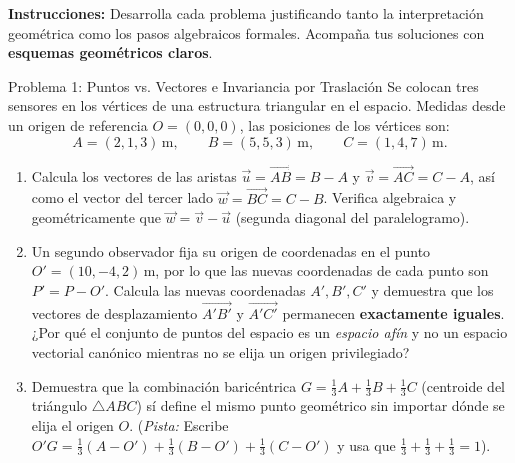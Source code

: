 \documentclass[11pt,letterpaper]{article}
\begin{document}
\setlength{\abovedisplayskip}{6pt}
\setlength{\belowdisplayskip}{6pt}
\setlength{\textfloatsep}{10pt}
\setlength{\intextsep}{8pt}
\color{blackmain}


\noindent\textbf{Instrucciones:} Desarrolla cada problema justificando tanto la interpretación geométrica como los pasos algebraicos formales. Acompaña tus soluciones con \textbf{esquemas geométricos claros}.


\begin{infobox}{Problema 1: Puntos vs. Vectores e Invariancia por Traslación}
Se colocan tres sensores en los vértices de una estructura triangular en el espacio. Medidas desde un origen de referencia $O = (0,0,0)$, las posiciones de los vértices son:
\[
    A = (2, 1, 3)\,\text{m}, \qquad B = (5, 5, 3)\,\text{m}, \qquad C = (1, 4, 7)\,\text{m}.
\]
\begin{enumerate}[label=(\alph*)]
    \item Calcula los vectores de las aristas $\vec{u} = \overrightarrow{AB} = B - A$ y $\vec{v} = \overrightarrow{AC} = C - A$, así como el vector del tercer lado $\vec{w} = \overrightarrow{BC} = C - B$. Verifica algebraica y geométricamente que $\vec{w} = \vec{v} - \vec{u}$ (segunda diagonal del paralelogramo).
    \item Un segundo observador fija su origen de coordenadas en el punto $O' = (10, -4, 2)\,\text{m}$, por lo que las nuevas coordenadas de cada punto son $P' = P - O'$. Calcula las nuevas coordenadas $A', B', C'$ y demuestra que los vectores de desplazamiento $\overrightarrow{A'B'}$ y $\overrightarrow{A'C'}$ permanecen \textbf{exactamente iguales}. ¿Por qué el conjunto de puntos del espacio es un \emph{espacio afín} y no un espacio vectorial canónico mientras no se elija un origen privilegiado?
    \item Demuestra que la combinación baricéntrica $G = \frac{1}{3}A + \frac{1}{3}B + \frac{1}{3}C$ (centroide del triángulo $\triangle ABC$) sí define el mismo punto geométrico sin importar dónde se elija el origen $O$. (\emph{Pista:} Escribe $O'G = \frac{1}{3}(A-O') + \frac{1}{3}(B-O') + \frac{1}{3}(C-O')$ y usa que $\frac{1}{3}+\frac{1}{3}+\frac{1}{3}=1$).
\end{enumerate}
\end{infobox}
\end{document}

